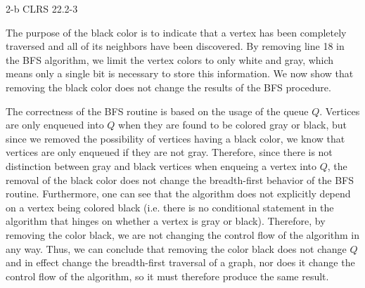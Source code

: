 \documentclass[11pt]{article}
\begin{document}
\begin{prob}{2-b}
CLRS 22.2-3 
\end{prob}
\begin{sol} 

The purpose of the black color is to indicate that a vertex has been completely traversed and all of its neighbors have been discovered. By removing line 18 in the BFS algorithm, we limit the vertex colors to only white and gray, which means only a single bit is necessary to store this information. We now show that removing the black color does not change the results of the BFS procedure. 

The correctness of the BFS routine is based on the usage of the queue $Q$. Vertices are only enqueued into $Q$ when they are found to be colored gray or black, but since we removed the possibility of vertices having a black color, we know that vertices are only enqueued if they are not gray. Therefore, since there is not distinction between gray and black vertices when enqueing a vertex into $Q$, the removal of the black color does not change the breadth-first behavior of the BFS routine. Furthermore, one can see that the algorithm does not explicitly depend on a vertex being colored black (i.e. there is no conditional statement in the algorithm that hinges on whether a vertex is gray or black). Therefore, by removing the color black, we are not changing the control flow of the algorithm in any way. Thus, we can conclude that removing the color black does not change $Q$ and in effect change the breadth-first traversal of a graph, nor does it change the control flow of the algorithm, so it must therefore produce the same result.

\begin{comment}
Let $v$ be a vertex in that was just added to $Q$ for the first time. If at a later point in time (after $v$ was added to $Q$) $v$ is re-added to $Q$, we now have the sequence $v, v_{1}, v_{2}, ..., v_{i}, v$ contained in $Q$. Based on the iterative approach to the BFS procedure, all of the vertices $v, v_{1}, v_{2}, ..., v_{i}$ will be colored black by the time the second instance of $v$ is dequeued from $Q$ to be processed. This has two implications:

\begin{enumerate}
	\item The number of vertices adjacent to $v$ that are enqueued upon the first visit to $v$ will be strictly larger than the number of vertices adjacent to $v$ that are enqueued upon the second visit to $v$. 
	\item The first visit to $v$ will enqueue all of the vertices in $V$ that are adjacent to $v$ following the normal breadth-first traversal approach, so any duplicate vertices that are re-added upon the second visit to $v$ will have already been added to the queue in the appropriate BFS.
\end{enumerate}
\end{comment}


\end{sol}
\end{document}
